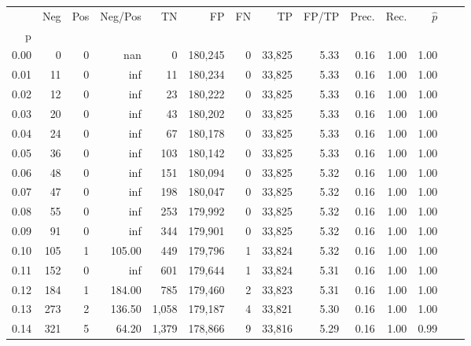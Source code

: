 \begin{tabular}{rrrrrrrrrrrrrr}
\toprule
{} &    Neg &    Pos & Neg/Pos &       TN &       FP &      FN &      TP & FP/TP & Prec. &  Rec. & $\hat{p}$ \\
p    &        &        &         &          &          &         &         &       &       &       &           \\
\midrule
0.00 &      0 &      0 &     nan &        0 &  180,245 &       0 &  33,825 &  5.33 &  0.16 &  1.00 &      1.00 \\
0.01 &     11 &      0 &     inf &       11 &  180,234 &       0 &  33,825 &  5.33 &  0.16 &  1.00 &      1.00 \\
0.02 &     12 &      0 &     inf &       23 &  180,222 &       0 &  33,825 &  5.33 &  0.16 &  1.00 &      1.00 \\
0.03 &     20 &      0 &     inf &       43 &  180,202 &       0 &  33,825 &  5.33 &  0.16 &  1.00 &      1.00 \\
0.04 &     24 &      0 &     inf &       67 &  180,178 &       0 &  33,825 &  5.33 &  0.16 &  1.00 &      1.00 \\
0.05 &     36 &      0 &     inf &      103 &  180,142 &       0 &  33,825 &  5.33 &  0.16 &  1.00 &      1.00 \\
0.06 &     48 &      0 &     inf &      151 &  180,094 &       0 &  33,825 &  5.32 &  0.16 &  1.00 &      1.00 \\
0.07 &     47 &      0 &     inf &      198 &  180,047 &       0 &  33,825 &  5.32 &  0.16 &  1.00 &      1.00 \\
0.08 &     55 &      0 &     inf &      253 &  179,992 &       0 &  33,825 &  5.32 &  0.16 &  1.00 &      1.00 \\
0.09 &     91 &      0 &     inf &      344 &  179,901 &       0 &  33,825 &  5.32 &  0.16 &  1.00 &      1.00 \\
0.10 &    105 &      1 &  105.00 &      449 &  179,796 &       1 &  33,824 &  5.32 &  0.16 &  1.00 &      1.00 \\
0.11 &    152 &      0 &     inf &      601 &  179,644 &       1 &  33,824 &  5.31 &  0.16 &  1.00 &      1.00 \\
0.12 &    184 &      1 &  184.00 &      785 &  179,460 &       2 &  33,823 &  5.31 &  0.16 &  1.00 &      1.00 \\
0.13 &    273 &      2 &  136.50 &    1,058 &  179,187 &       4 &  33,821 &  5.30 &  0.16 &  1.00 &      1.00 \\
0.14 &    321 &      5 &   64.20 &    1,379 &  178,866 &       9 &  33,816 &  5.29 &  0.16 &  1.00 &      0.99 \\

\end{tabular}
